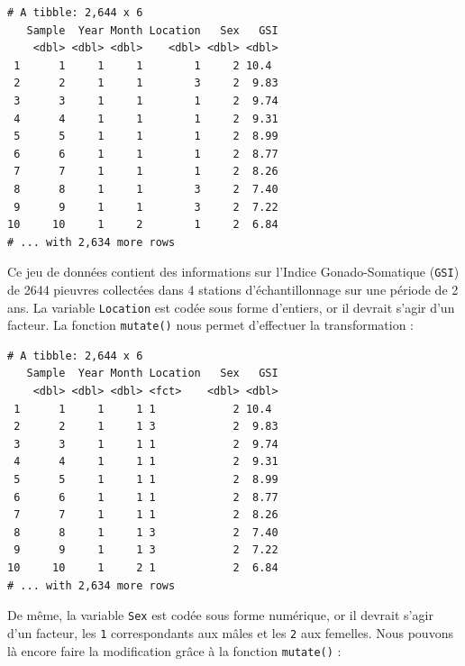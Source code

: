 \documentclass[a4paperpaper,]{article}
\newenvironment{Shaded}{\begin{snugshade}}{\end{snugshade}}
\newcommand{\KeywordTok}[1]{\textcolor[rgb]{0.13,0.29,0.53}{\textbf{#1}}}
\newcommand{\DataTypeTok}[1]{\textcolor[rgb]{0.13,0.29,0.53}{#1}}
\newcommand{\DecValTok}[1]{\textcolor[rgb]{0.00,0.00,0.81}{#1}}
\newcommand{\StringTok}[1]{\textcolor[rgb]{0.31,0.60,0.02}{#1}}
\newcommand{\OperatorTok}[1]{\textcolor[rgb]{0.81,0.36,0.00}{\textbf{#1}}}
\newcommand{\NormalTok}[1]{#1}
\theoremstyle{definition}
\theoremstyle{definition}
\theoremstyle{definition}
\theoremstyle{remark}
\begin{document}
\begin{verbatim}
# A tibble: 2,644 x 6
   Sample  Year Month Location   Sex   GSI
    <dbl> <dbl> <dbl>    <dbl> <dbl> <dbl>
 1      1     1     1        1     2 10.4 
 2      2     1     1        3     2  9.83
 3      3     1     1        1     2  9.74
 4      4     1     1        1     2  9.31
 5      5     1     1        1     2  8.99
 6      6     1     1        1     2  8.77
 7      7     1     1        1     2  8.26
 8      8     1     1        3     2  7.40
 9      9     1     1        3     2  7.22
10     10     1     2        1     2  6.84
# ... with 2,634 more rows
\end{verbatim}

Ce jeu de données contient des informations sur l'Indice
Gonado-Somatique (\texttt{GSI}) de 2644 pieuvres collectées dans 4
stations d'échantillonnage sur une période de 2 ans. La variable
\texttt{Location} est codée sous forme d'entiers, or il devrait s'agir
d'un facteur. La fonction \texttt{mutate()} nous permet d'effectuer la
transformation :

\begin{Shaded}
\end{Shaded}

\begin{verbatim}
# A tibble: 2,644 x 6
   Sample  Year Month Location   Sex   GSI
    <dbl> <dbl> <dbl> <fct>    <dbl> <dbl>
 1      1     1     1 1            2 10.4 
 2      2     1     1 3            2  9.83
 3      3     1     1 1            2  9.74
 4      4     1     1 1            2  9.31
 5      5     1     1 1            2  8.99
 6      6     1     1 1            2  8.77
 7      7     1     1 1            2  8.26
 8      8     1     1 3            2  7.40
 9      9     1     1 3            2  7.22
10     10     1     2 1            2  6.84
# ... with 2,634 more rows
\end{verbatim}

De même, la variable \texttt{Sex} est codée sous forme numérique, or il
devrait s'agir d'un facteur, les \texttt{1} correspondants aux mâles et
les \texttt{2} aux femelles. Nous pouvons là encore faire la
modification grâce à la fonction \texttt{mutate()} :

\begin{Shaded}
\end{Shaded}
\end{document}
